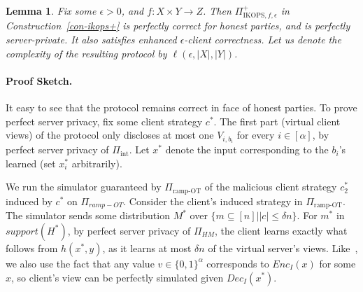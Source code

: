 \documentclass[a4paper]{article}
\newtheorem{theorem}{Theorem}[section]
\newtheorem{lemma}[theorem]{Lemma}
\newcommand{\INT}{\Pi_{\text{int}}}
\begin{document}
\begin{lemma}\label{thm-pcl}
	Fix some $\epsilon>0$, and $f:X\times Y\rightarrow Z$. Then $\Pi^+_{\text{IKOPS},f,\epsilon}$ in
	Construction~\ref{con-ikops+} is perfectly correct for honest parties, and is perfectly server-private. It also satisfies enhanced $\epsilon$-client correctness. Let us denote the complexity of the resulting protocol by $\ell(\epsilon,|X|,|Y|)$.
\end{lemma}



\paragraph{Proof Sketch.} It easy to see that the protocol remains correct in face of honest parties. 
To prove  perfect server privacy, fix some client strategy $c^*$. The first part (virtual client views) of the protocol only discloses at most one $V_{i,b_i}$ for every $i\in[\alpha]$, by perfect server privacy of $\INT$. Let $x^*$ denote the input corresponding to the $b_i$'s learned (set $x^*_i$ arbitrarily).

We run the simulator guaranteed by $\Pi_{\text{ramp-OT}}$ of the malicious client strategy $c^*_2$ induced by $c^*$ on $\Pi_{ramp-OT}$. 
Consider the client's induced strategy in $\Pi_{\text{ramp-OT}}$. The simulator sends some distribution $M^*$ over $\{m\subseteq [n]||c|\leq \delta n\}$.
For $m^*$ in $support(H^*)$, by perfect server privacy of $\Pi_{HM}$, the client learns exactly what follows from $h(x^*,y)$, as it learns at most $\delta n$ of the virtual server's views. Like~\cite{IKOPS11}, we also use the fact that any value $v\in \{0,1\}^{\alpha}$ corresponds to $Enc_I(x)$ for some $x$, so client's view can be perfectly simulated given $Dec_I(x^*)$.
\end{document}
